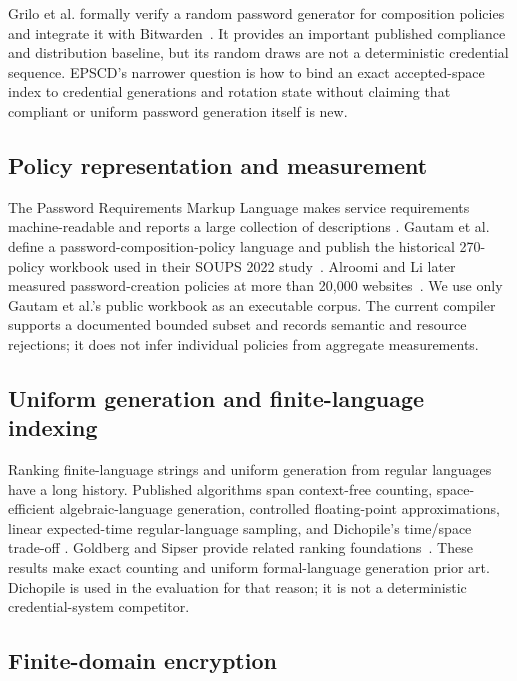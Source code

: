 \documentclass[preprint,12pt]{elsarticle}
\begin{document}
Grilo et al. formally verify a random password generator for composition
policies and integrate it with Bitwarden~\cite{grilo2022verified}. It provides
an important published compliance and distribution baseline, but its random
draws are not a deterministic credential sequence. EPSCD's narrower question
is how to bind an exact accepted-space index to credential generations and
rotation state without claiming that compliant or uniform password generation
itself is new.

\subsection{Policy representation and measurement}

The Password Requirements Markup Language makes service requirements
machine-readable and reports a large collection of descriptions
\cite{horsch2016prml}. Gautam et al. define a password-composition-policy
language and publish the historical 270-policy workbook used in their SOUPS
2022 study~\cite{gautam2022pcp}. Alroomi and Li later measured password-creation
policies at more than 20,000 websites~\cite{alroomi2023policies}. We use only
Gautam et al.'s public workbook as an executable corpus. The current compiler
supports a documented bounded subset and records semantic and resource
rejections; it does not infer individual policies from aggregate measurements.

\subsection{Uniform generation and finite-language indexing}

Ranking finite-language strings and uniform generation from regular languages
have a long history. Published algorithms span context-free counting,
space-efficient algebraic-language generation, controlled floating-point
approximations, linear expected-time regular-language sampling, and Dichopile's
time/space trade-off
\cite{hickey1983uniform,goldwurm1995random,denise1999uniform,
bernardi2012linear,oudinet2013uniform}. Goldberg and Sipser provide related
ranking foundations~\cite{goldberg1985ranking}. These results make exact
counting and uniform formal-language generation prior art. Dichopile is used in
the evaluation for that reason; it is not a deterministic credential-system
competitor.

\subsection{Finite-domain encryption}
\end{document}
